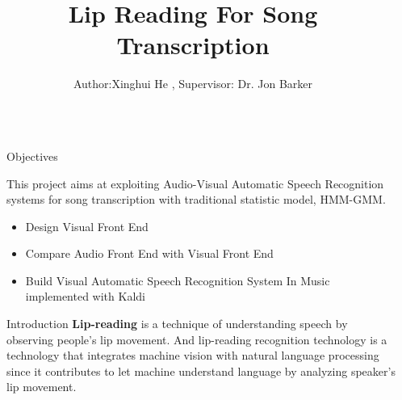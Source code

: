 \documentclass[final]{beamer}
\title{Lip Reading For Song Transcription} %
\author{Author:Xinghui He , Supervisor: Dr. Jon Barker} %
\institute{Department of Computer Science} %
\newlength{\sepwid}
\newlength{\onecolwid}
\begin{document}

\setlength{\belowcaptionskip}{2ex} %
\setlength\belowdisplayshortskip{2ex} %

\begin{frame}[t] %

\begin{columns}[t] %

\begin{column}{\sepwid}\end{column} %

\begin{column}{\onecolwid} %


\begin{alertblock}{Objectives}

This project aims at exploiting Audio-Visual Automatic Speech Recognition systems for song transcription with traditional statistic model, HMM-GMM.
\begin{itemize}

\item Design Visual Front End 
\item Compare Audio Front End with Visual Front End
\item Build Visual Automatic Speech Recognition System In Music implemented with Kaldi
\end{itemize}

\end{alertblock}


\begin{block}{Introduction}
\textbf{Lip-reading} is a technique of understanding speech by observing people's lip movement. And lip-reading recognition technology is a technology that integrates machine vision with natural language processing since it contributes to let machine understand language by analyzing speaker's lip movement.\\


\end{block}
\end{column}
\end{columns}
\end{frame}
\end{document}
